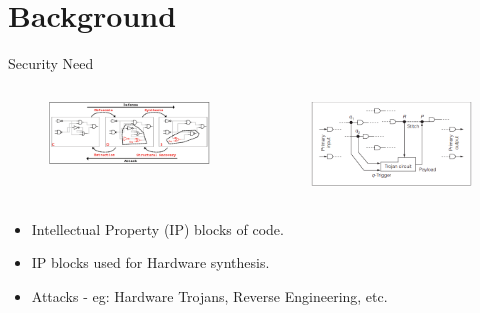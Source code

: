 \documentclass[xcolor=dvipsnames]{beamer}
\begin{document}
    \section{Background}
    \begin{frame}{Security Need}

        \begin{columns}
            
            \begin{column}{0.5\textwidth}
                
                \begin{figure}
                    \includegraphics[scale=0.6]{ReverseEng.PNG}
                \end{figure}

            \end{column}

            \begin{column}{0.5\textwidth}
                
                \begin{figure}
                    \includegraphics[scale=0.6]{TrojanEx.PNG}
                \end{figure}

            \end{column}

        \end{columns}



        \begin{itemize}
            \item Intellectual Property (IP) blocks of code. 
            \item IP blocks used for Hardware synthesis.
            \item Attacks - eg: Hardware Trojans, Reverse Engineering, etc.
        \end{itemize}
        
    \end{frame}
\end{document}
